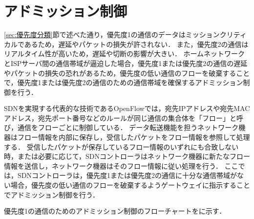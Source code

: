 \documentclass[a4paper,11pt,uplatex]{ujreport}
\begin{document}
\section{アドミッション制御}
\label{sec:アドミッション制御}

  \ref{sec:優先度分類}節で述べた通り，優先度1の通信のデータはミッションクリティカルであるため，遅延やパケットの損失が許されない．
  また，優先度2の通信はリアルタイム性が高いため，遅延や切断の影響が大きい．
  ホームネットワークとISPサーバ間の通信帯域が逼迫した場合，優先度1または優先度2の通信の遅延やパケットの損失の恐れがあるため，優先度の低い通信のフローを破棄することで，優先度1または優先度2の通信のための通信帯域を確保するアドミッション制御を行う．\par

  SDNを実現する代表的な技術であるOpenFlowでは，宛先IPアドレスや宛先MACアドレス，宛先ポート番号などのルールが同じ通信の集合体を「フロー」と呼び，通信をフローごとに制御している．
  データ転送機能を担うネットワーク機器はフロー情報を内部に保存し，受信したパケットをフロー情報を参照して処理する．
  受信したパケットが保存しているフロー情報のいずれにも合致しない時，または必要に応じて，SDNコントローラはネットワーク機器に新たなフロー情報を送信し，ネットワーク機器はそのフロー情報に従い処理を行う．
  ここでは，SDNコントローラは，優先度1または優先度2の通信に十分な通信帯域がない場合，優先度の低い通信のフローを破棄するようゲートウェイに指示することでアドミッション制御を行う．\par

  優先度1の通信のためのアドミッション制御のフローチャートをに示す．\par
\end{document}
